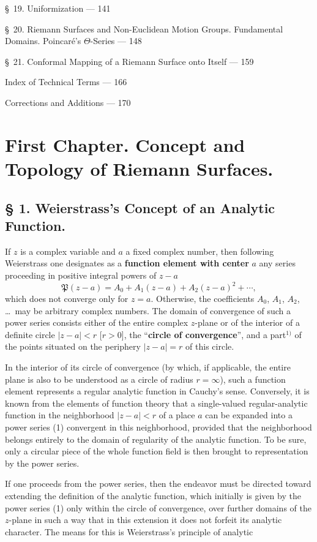 \documentclass{article}
\begin{document}
§~19. Uniformization --- 141

§~20. Riemann Surfaces and Non-Euclidean Motion Groups. Fundamental Domains. Poincaré's $\Theta$-Series --- 148

§~21. Conformal Mapping of a Riemann Surface onto Itself --- 159

Index of Technical Terms --- 166

Corrections and Additions --- 170

\section*{First Chapter. Concept and Topology of Riemann Surfaces.}

\subsection*{§ 1. Weierstrass's Concept of an Analytic Function.}

If $z$ is a complex variable and $a$ a fixed complex number, then following Weierstrass one designates as a \textbf{function element with center} $a$ any series proceeding in positive integral powers of $z - a$
\[ \mathfrak{P}(z - a) = A_0 + A_1(z - a) + A_2(z - a)^2 + \cdots, \tag{1} \]
which does not converge only for $z = a$. Otherwise, the coefficients $A_0$, $A_1$, $A_2$, \dots\ may be arbitrary complex numbers. The domain of convergence of such a power series consists either of the entire complex $z$-plane or of the interior of a definite circle $|z - a| < r$ [$r > 0$], the ``\textbf{circle of convergence}'', and a part${}^{1)}$ of the points situated on the periphery $|z - a| = r$ of this circle.

In the interior of its circle of convergence (by which, if applicable, the entire plane is also to be understood as a circle of radius $r = \infty$), such a function element represents a regular analytic function in Cauchy's sense. Conversely, it is known from the elements of function theory that a single-valued regular-analytic function in the neighborhood $|z - a| < r$ of a place $a$ can be expanded into a power series (1) convergent in this neighborhood, provided that the neighborhood belongs entirely to the domain of regularity of the analytic function. To be sure, only a circular piece of the whole function field is then brought to representation by the power series.

If one proceeds from the power series, then the endeavor must be directed toward extending the definition of the analytic function, which initially is given by the power series (1) only within the circle of convergence, over further domains of the $z$-plane in such a way that in this extension it does not forfeit its analytic character. The means for this is Weierstrass's principle of analytic
\end{document}
